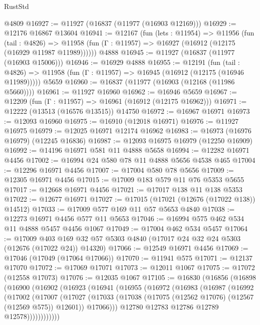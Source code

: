\begin{lexlean}{RustStd}
\begin{coremodule}
    @4809
@16927 := @11927 (@16837 (@11977 (@16903 @12169)))
@16929 := @12176 @16867 @13604
@16941 := @12167
    (fun (lets : @11954) =>
    @11956
      (fun (tail : @4826) =>
      @11958 (fun (Γ : @11957) => @16927 (@16912 (@12175 (@16929 @11987 @11989))))))
    @4888
@16945 := @11927 (@16837 (@11977 (@16903 @15006)))
@16946 := @16929 @4888
@16955 := @12191
    (fun (tail : @4826) => @11958 (fun (Γ : @11957) => @16945 (@16912 (@12175 (@16946 @11989)))))
    @5659
@16960 := @16837 (@11977 (@16903 (@12168 (@11986 @5660))))
@16961 := @11927 @16960
@16962 := @16946 @5659
@16967 := @12209 (fun (Γ : @11957) => @16961 (@16912 (@12175 @16962)))
@16971 := @12222 (@13513 (@16576 @13515)) @14750
@16972 := @16967 @16971
@16973 := @12093 @16960
@16975 := @16910 (@12018 @16971)
@16976 := @11927 @16975
@16979 := @12025 @16971 @12174 @16962
@16983 := @16973 (@16976 @16979) (@12245 @16836)
@16987 := @12093 @16975 @16979 (@12250 @16909)
@16992 := @14196 @16971 @581 @11 @4888 @5658
@16994 := @12282 @16971 @4456
@17002 := @16994 @24 @580 @78 @11 @4888 @5656 @4538 @465
@17004 := @12296 @16971 @4456
@17007 := @17004 @580 @78 @5656
@17009 := @12305 @16971 @4456
@17015 := @17009 @183 @579 @11 @76 @5353 @5655
@17017 := @12668 @16971 @4456
@17021 := @17017 @138 @11 @138 @5353
@17022 := @12677 @16971
@17027 := @17015 (@17021 (@12676 (@17022 @138)) @14512)
@17033 := @17009 @577 @169 @11 @57 @5653 @4840
@17038 := @12273 @16971 @4456 @577 @11 @5653
@17046 := @16994 @575 @462 @534 @11 @4888 @5457 @4456 @1067
@17049 := @17004 @462 @534 @5457
@17064 := @17009
    @403
    @169
    @32
    @57
    @5303
    @4840
    (@17017 @24 @32 @24 @5303 (@12676 (@17022 @24)) @14320)
@17066 := @12549 @16971 @4456
@17069 := @17046 (@17049 (@17064 @17066))
@17070 := @11941 @575
@17071 := @12137 @17070
@17072 := @17069 @17071
@17073 := @12011 @1067
@17075 := @17072 (@12558 @17073)
@17076 := @12035 @1067
@17105 := @16830
    (@16856
      (@16898
        (@16900
          (@16902
            (@16923
              (@16941
                (@16955
                  (@16972
                    (@16983
                      (@16987
                        (@16992
                          (@17002
                            (@17007
                              (@17027
                                (@17033
                                  (@17038 (@17075 (@12562 @17076) (@12567 (@12569 @575)) @12601))
                                  @17066)))
                            @12780
                            @12783
                            @12786
                            @12789
                            @12578))))))))))))

\end{coremodule}
\end{lexlean}
